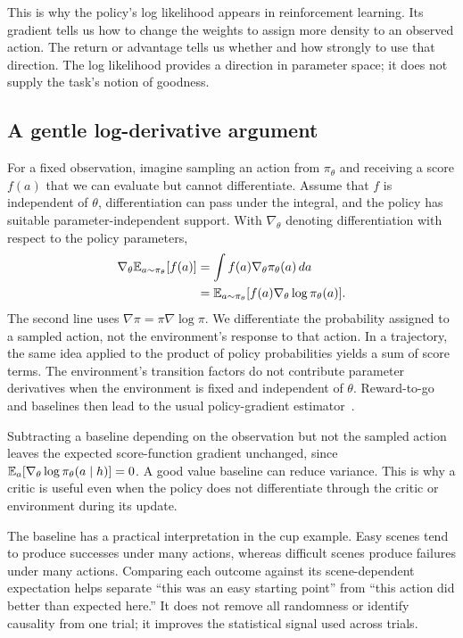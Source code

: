 This is why the policy's log likelihood appears in reinforcement learning. Its gradient tells us how to change the weights to assign more density to an observed action. The return or advantage tells us whether and how strongly to use that direction. The log likelihood provides a direction in parameter space; it does not supply the task's notion of goodness.

\subsection{A gentle log-derivative argument}
For a fixed observation, imagine sampling an action from $\pi_\theta$ and receiving a score $f(a)$ that we can evaluate but cannot differentiate. Assume that $f$ is independent of $\theta$, differentiation can pass under the integral, and the policy has suitable parameter-independent support. With $\nabla_\theta$ denoting differentiation with respect to the policy parameters,
\begin{align}
 \nabla_\theta\mathbb{E}_{a\sim\pi_\theta}[f(a)]
 &=\int f(a)\nabla_\theta\pi_\theta(a)\,da\nonumber\\
 &=\mathbb{E}_{a\sim\pi_\theta}
 [f(a)\nabla_\theta\log\pi_\theta(a)].
 \label{eq:score}
\end{align}
The second line uses $\nabla\pi=\pi\nabla\log\pi$. We differentiate the probability assigned to a sampled action, not the environment's response to that action. In a trajectory, the same idea applied to the product of policy probabilities yields a sum of score terms. The environment's transition factors do not contribute parameter derivatives when the environment is fixed and independent of $\theta$. Reward-to-go and baselines then lead to the usual policy-gradient estimator~\citep{policygradient}.

Subtracting a baseline depending on the observation but not the sampled action leaves the expected score-function gradient unchanged, since $\mathbb{E}_a[\nabla_\theta\log\pi_\theta(a\mid h)]=0$. A good value baseline can reduce variance. This is why a critic is useful even when the policy does not differentiate through the critic or environment during its update.

The baseline has a practical interpretation in the cup example. Easy scenes tend to produce successes under many actions, whereas difficult scenes produce failures under many actions. Comparing each outcome against its scene-dependent expectation helps separate ``this was an easy starting point'' from ``this action did better than expected here.'' It does not remove all randomness or identify causality from one trial; it improves the statistical signal used across trials.

